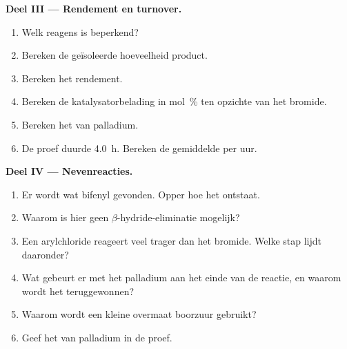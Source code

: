 \begin{problem}
\medskip
\noindent\textbf{Deel III --- Rendement en turnover.}
\begin{enumerate}[resume]
  \item Welk reagens is beperkend?
  \item Bereken de geïsoleerde hoeveelheid product.
  \item Bereken het rendement.
  \item Bereken de katalysatorbelading in mol~\% ten opzichte van het bromide.
  \item Bereken het  van palladium.
  \item De proef duurde \qty{4.0}{h}. Bereken de gemiddelde  per uur.
\end{enumerate}

\medskip
\noindent\textbf{Deel IV --- Nevenreacties.}
\begin{enumerate}[resume]
  \item Er wordt wat bifenyl  gevonden. Opper hoe het ontstaat.
  \item Waarom is hier geen $\beta$-hydride-eliminatie mogelijk?
  \item Een arylchloride reageert veel trager dan het bromide. Welke stap lijdt daaronder?
  \item Wat gebeurt er met het palladium aan het einde van de reactie, en waarom wordt het teruggewonnen?
  \item Waarom wordt een kleine overmaat boorzuur gebruikt?
  \item Geef het  van palladium in de proef.
\end{enumerate}
\end{problem}
